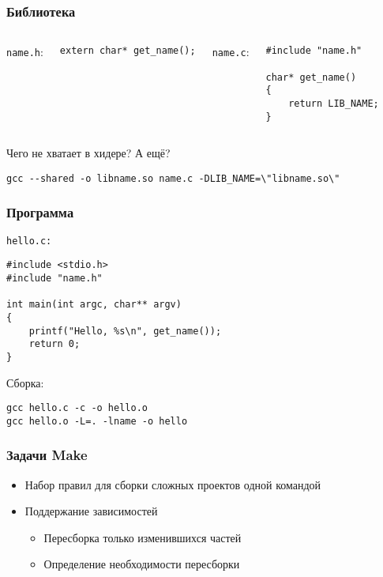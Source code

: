 \begin{frame}[fragile]
	\frametitle{Библиотека}

	\begin{columns}
		{\tt name.h}:

		\begin{lstlisting}
extern char* get_name();
		\end{lstlisting}

		{\tt name.c}:

		\begin{lstlisting}
#include "name.h"

char* get_name()
{
    return LIB_NAME;
}
		\end{lstlisting}
	\end{columns}
	
	\begin{center}
	Чего не хватает в хидере? А ещё?
\end{center}
\pause
	\begin{lstlisting}
gcc --shared -o libname.so name.c -DLIB_NAME=\"libname.so\"
	\end{lstlisting}
\end{frame}

\begin{frame}[fragile]
	\frametitle{Программа}

	{\tt hello.с:}

	\begin{lstlisting}
#include <stdio.h>
#include "name.h"

int main(int argc, char** argv)
{
    printf("Hello, %s\n", get_name());
    return 0;
}
	\end{lstlisting}

	Сборка:

	\begin{verbatim}
gcc hello.c -c -o hello.o
gcc hello.o -L=. -lname -o hello
	\end{verbatim}
\end{frame}

\begin{frame}
  \frametitle{Задачи Make}
  \begin{itemize}
     \item Набор правил для сборки сложных проектов одной командой
     \item Поддержание зависимостей
       \begin{itemize}
         \item Пересборка только изменившихся частей
         \item Определение необходимости пересборки
       \end{itemize}
  \end{itemize}
\end{frame}

